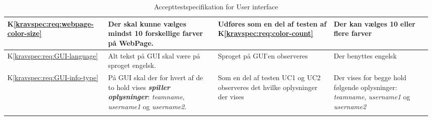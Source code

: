 \documentclass[Accepttestspecifikation/Accepttest_Main.tex]{subfiles}
\begin{document}
\begin{longtable}{|L{0.08\textwidth}|L{0.3\textwidth}|L{0.3\textwidth}|L{0.2\textwidth}|L{0.2\textwidth}|}
K\ref{kravspec:req:webpage-color-size} & Der skal kunne vælges mindst 10 forskellige farver på WebPage. & Udføres som en del af testen af K\ref{kravspec:req:color-count} & Der kan vælges 10 eller flere farver & \\ \hline
K\ref{kravspec:req:GUI-language} & Alt tekst på GUI skal være på sproget engelsk. & Sproget på GUI'en observeres & Der benyttes engelsk &  \\ \hline
K\ref{kravspec:req:GUI-info-type} & På GUI skal der for hvert af de to hold vises \textit{\textbf{spiller oplysninger}}: \textit{teamname}, \textit{username1} og \textit{username2}. & Som en del af testen UC1 og UC2 observeres det hvilke oplysninger der vises & Der vises for begge hold følgende oplysninger: \textit{teamname}, \textit{username1} og \textit{username2}& \\ \hline


\caption{Accepttestspecifikation for User interface}
\label{tab:IkkeFunktFysiske}
\end{longtable}
\end{document}
